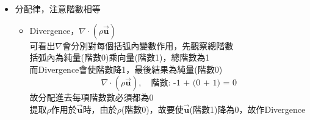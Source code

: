\documentclass[../main.tex]{subfiles}
\begin{document}
\begin{itemize}
\begin{itemize}
\begin{align}
        &\phantom{=\frac{\partial^2 u_x}{\partial x^2} +} 
        + \left(
          \frac{\partial^2 u_z}{\partial x^2} + \frac{\partial^2 u_z}{\partial y^2} + \frac{\partial^2 u_z}{\partial z^2}
        \right) \bm \delta_z
      \end{align}
      \item Curl(旋度):\\
      ，向量微分為向量
      \begin{equation}
        \nabla \times \vec {\bm u} = 
        \begin{vmatrix}
          \bm \delta_x & \bm \delta_y & \bm \delta_z \\
          \frac{\partial }{\partial x} & \frac{\partial }{\partial y} & \frac{\partial }{\partial z} \\
          u_x & u_y & u_z
        \end{vmatrix} \label{eq:curl_definition}
      \end{equation}
      行列式展開後:
      \begin{equation}
        \nabla \times \vec {\bm u} =\left(
          \frac{\partial u_z}{\partial y} - \frac{\partial u_y}{\partial z}
        \right) \bm \delta_x + \left(
          \frac{\partial u_x}{\partial z} - \frac{\partial u_z}{\partial x}
        \right) \bm \delta_y + \left(
          \frac{\partial u_y}{\partial x} - \frac{\partial u_x}{\partial y}
        \right) \bm \delta_z
      \end{equation}
    \end{itemize}
  \item 分配律，注意階數相等
    \begin{itemize}
      \item Divergence，$\nabla \cdot (\rho \vec {\bm u})$\\
        可看出$\nabla$會分別對每個括弧內變數作用，先觀察總階數\\
        括弧內為純量(階數0)乘向量(階數1)，總階數為1\\
        而Divergence會使階數降1，最後結果為純量(階數0)
        \begin{equation}
          \nabla \cdot (\rho \vec {\bm u}), \quad \text{階數: -1 + (0 + 1) = 0}
        \end{equation}
        故分配進去每項階數數必須都為0\\
        提取$\rho$作用於$\vec {\bm u}$時，由於$\rho$(階數0)，故要使$\vec {\bm u}$(階數1)降為0，故作Divergence
        \begin{equation}

\end{equation}
\end{itemize}
\end{itemize}
\end{document}
